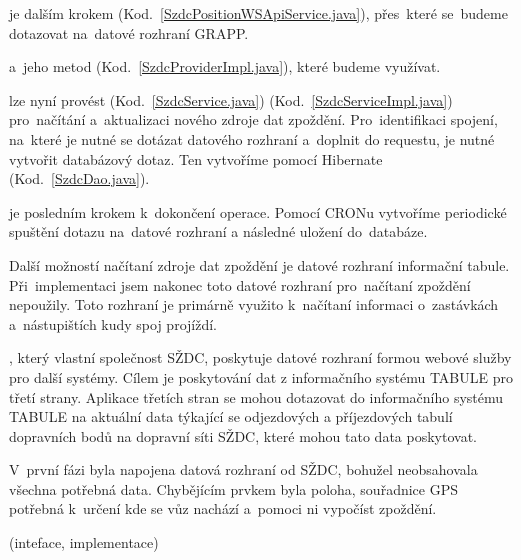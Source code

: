  je dalším krokem (Kod.~\ref{SzdcPositionWSApiService.java}), přes~které se~budeme dotazovat na~datové rozhraní GRAPP.


 a~jeho metod (Kod.~\ref{SzdcProviderImpl.java}), které budeme využívat.


 lze nyní provést (Kod.~\ref{SzdcService.java}) (Kod.~\ref{SzdcServiceImpl.java}) pro~načítání a~aktualizaci nového zdroje dat zpoždění. Pro~identifikaci spojení, na~které je nutné se dotázat datového rozhraní a~doplnit do requestu, je nutné vytvořit databázový dotaz. Ten vytvoříme pomocí Hibernate (Kod.~\ref{SzdcDao.java}).


 je posledním krokem k~dokončení operace. Pomocí CRONu vytvoříme periodické spuštění dotazu na~datové rozhraní a následné uložení do~databáze.



Další možností načítaní zdroje dat zpoždění je datové rozhraní informační tabule. Při~implementaci jsem nakonec toto datové rozhraní pro~načítaní zpoždění nepoužily. Toto rozhraní je primárně  využito k~načítaní informaci o~zastávkách a~nástupištích kudy spoj projíždí.

, který vlastní společnost SŽDC, poskytuje datové rozhraní formou webové služby pro další systémy. Cílem je poskytování dat z informačního systému TABULE pro třetí strany. Aplikace třetích stran se mohou dotazovat do informačního systému TABULE na aktuální data týkající se odjezdových a příjezdových tabulí dopravních bodů na dopravní síti SŽDC, které mohou tato data poskytovat.

V~první fázi byla napojena datová rozhraní od SŽDC, bohužel neobsahovala všechna potřebná data. Chybějícím prvkem byla poloha, souřadnice GPS potřebná k~určení kde se vůz nachází a~pomoci ni vypočíst zpoždění.

 (inteface, implementace)
	
	
